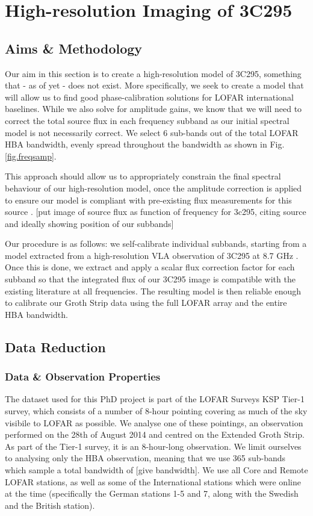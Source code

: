 \chapter{High-resolution Imaging of 3C295}

\section{Aims \& Methodology}
\pg
Our aim in this section is to create a high-resolution model of 3C295, something that - as
of yet - does not exist. More specifically, we seek to create a model that will allow us to find
good phase-calibration solutions for LOFAR international baselines. While we also solve for
amplitude gains, we know that we will need to correct the total source flux in each frequency
subband as our initial spectral model is not necessarily correct.
We select 6 sub-bands out of the total LOFAR HBA bandwidth, evenly spread throughout the bandwidth as shown in Fig. \ref{fig.freqsamp}.

\pg
This approach should allow us to appropriately constrain the final spectral behaviour of our high-resolution model, once the amplitude correction is applied to ensure our model is compliant with pre-existing flux measurements for this source . [put image of source flux as function of frequency for 3c295, citing source and ideally showing position of our subbands]

\pg
Our procedure is as follows: we self-calibrate individual subbands, starting from a model
extracted from a high-resolution VLA observation of 3C295 at 8.7 GHz . Once this is done,
we extract and apply a scalar flux correction factor for each subband so that the integrated flux of our 3C295 image is compatible with the existing literature at all frequencies. The resulting model is then reliable enough to calibrate our Groth Strip data using the full LOFAR array and the entire HBA bandwidth.

\section{Data Reduction}

\subsection{Data \& Observation Properties}
\pg
The dataset used for this PhD project is part of the LOFAR Surveys KSP Tier-1 survey, which consists of a number of 8-hour pointing covering as much of the sky visibile to LOFAR as possible. We analyse one of these pointings, an observation performed on the 28th of August 2014 and centred on the Extended Groth Strip. As part of the Tier-1 survey, it is an 8-hour-long observation. We limit ourselves to analysing only the HBA observation, meaning that we use 365 sub-bands which sample a total bandwidth of [give bandwidth]. We use all Core and Remote LOFAR stations, as well as some of the International stations which were online at the time (specifically the German stations 1-5 and 7, along with the Swedish and the British station).


